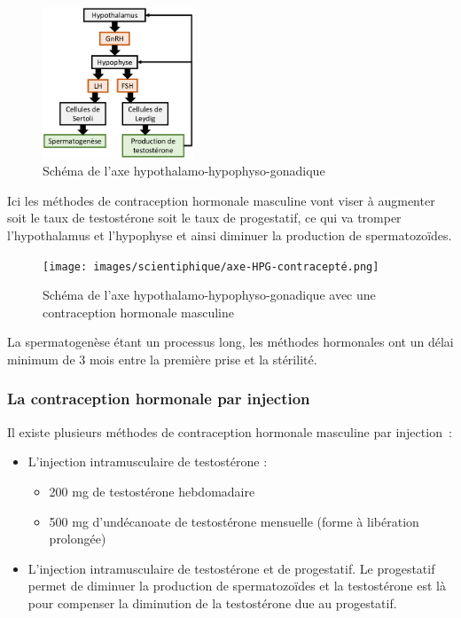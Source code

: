 \documentclass[12pt,a4paper]{report}
\begin{document}
\begin{figure}[h]
    \centering
    \includegraphics[width=0.4\textwidth]{images/scientiphique/axe-HPG.png}
    \caption{Schéma de l'axe hypothalamo-hypophyso-gonadique}
    \label{fig:axe-hypothalamo-hypophyso-gonadique}
\end{figure}

Ici les méthodes de contraception hormonale masculine vont viser à augmenter soit le taux de testostérone soit le taux de progestatif, ce qui va tromper l'hypothalamus et l'hypophyse et ainsi diminuer la production de spermatozoïdes. \cite{abbeMaleContraception2020}

\begin{figure}[h]
    \centering
    \texttt{[image: images/scientiphique/axe-HPG-contracepté.png]}
    \caption{Schéma de l'axe hypothalamo-hypophyso-gonadique avec une contraception hormonale masculine}
    \label{fig:axe-hypothalamo-hypophyso-gonadique-contracepte}
\end{figure}

La spermatogenèse étant un processus long, les méthodes hormonales ont un délai minimum de 3 mois entre la première prise et la stérilité. 

\subsubsection{La contraception hormonale par injection}

Il existe plusieurs méthodes de contraception hormonale masculine par injection :
\begin{itemize}
    \item L'injection intramusculaire de testostérone :
    \begin{itemize}
        \item 200 mg de testostérone hebdomadaire 
        \item 500 mg d’undécanoate de testostérone mensuelle (forme à libération prolongée) \cite{tcherdukianContraceptionMasculineQuelles2020}
    \end{itemize}
    \item L'injection intramusculaire de testostérone et de progestatif. Le progestatif permet de diminuer la production de spermatozoïdes et la testostérone est là pour compenser la diminution de la testostérone due au progestatif. \cite{longUpdateNovelHormonal2021}
\end{itemize}
\end{document}
